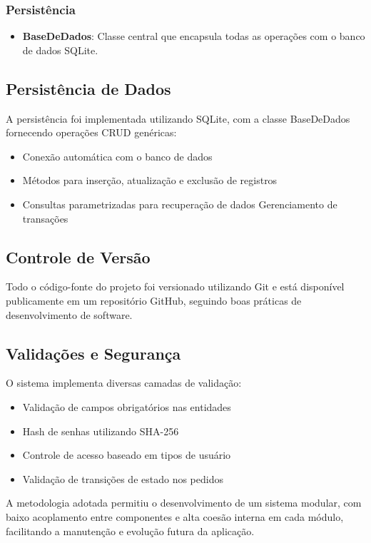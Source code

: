 \documentclass[conference]{IEEEtran}
\begin{document}
\subsubsection{Persistência}
\begin{itemize}
    \item \textbf{BaseDeDados}: Classe central que encapsula todas as operações com o banco de dados SQLite.
\end{itemize}

\subsection{Persistência de Dados}
A persistência foi implementada utilizando SQLite, com a classe BaseDeDados fornecendo operações CRUD genéricas:

\begin{itemize}
    \item Conexão automática com o banco de dados
    \item Métodos para inserção, atualização e exclusão de registros
    \item Consultas parametrizadas para recuperação de dados
    \interface{} Gerenciamento de transações
\end{itemize}

\subsection{Controle de Versão}
Todo o código-fonte do projeto foi versionado utilizando Git e está disponível publicamente em um repositório GitHub, seguindo boas práticas de desenvolvimento de software.

\subsection{Validações e Segurança}
O sistema implementa diversas camadas de validação:

\begin{itemize}
    \item Validação de campos obrigatórios nas entidades
    \item Hash de senhas utilizando SHA-256
    \item Controle de acesso baseado em tipos de usuário
    \item Validação de transições de estado nos pedidos
\end{itemize}

A metodologia adotada permitiu o desenvolvimento de um sistema modular, com baixo acoplamento entre componentes e alta coesão interna em cada módulo, facilitando a manutenção e evolução futura da aplicação.
\end{document}
